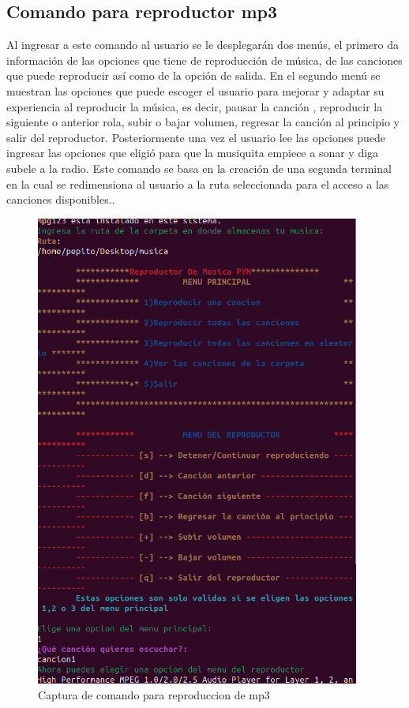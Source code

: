 \documentclass[12pt,a4paper]{article}
\begin{document}
\subsection{Comando para reproductor mp3}
\noindent Al ingresar a este comando al usuario se le desplegarán dos menús, el primero da información de las opciones que tiene de reproducción de música, de las canciones que puede reproducir así como de la opción de salida.
En el segundo menú se muestran las opciones que puede escoger el usuario para mejorar y adaptar su experiencia al reproducir la música, es decir, pausar la canción , reproducir la siguiente o anterior rola, subir o bajar volumen, regresar la canción al principio y salir del reproductor.
Posteriormente una vez el usuario lee las opciones puede ingresar las opciones que eligió para que la musiquita empiece a sonar y diga subele a la radio.
Este comando se basa en la creación de una  segunda terminal en la cual se redimensiona al usuario a la ruta seleccionada para el acceso a las canciones disponibles..


\begin{figure}[H]
    \centering
    \includegraphics[width=0.95\textwidth]{img/mp3.jpeg}
    \caption{Captura de comando para reproduccion de mp3}
    \label{mp3}
\end{figure}
\end{document}
